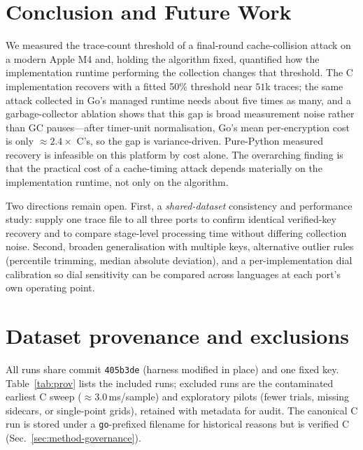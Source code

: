 \documentclass[11pt]{article}
\begin{document}
\section{Conclusion and Future Work}
\label{sec:conclusion}

We measured the trace-count threshold of a final-round cache-collision attack on
a modern Apple M4 and, holding the algorithm fixed, quantified how the
implementation runtime performing the collection changes that threshold. The C
implementation recovers with a fitted 50\% threshold near $51$k traces; the same
attack collected in Go's managed runtime needs about five times as many, and a
garbage-collector ablation shows that this gap is broad measurement noise rather
than GC pauses---after timer-unit normalisation, Go's mean per-encryption cost is
only $\approx2.4\times$ C's, so the gap is variance-driven. Pure-Python measured
recovery is infeasible on this platform by cost alone. The overarching finding is
that the practical cost of a cache-timing attack depends materially on the
implementation runtime, not only on the algorithm.

Two directions remain open. First, a \emph{shared-dataset} consistency and
performance study: supply one trace file to all three ports to confirm identical
verified-key recovery and to compare stage-level processing time without
differing collection noise. Second, broaden generalisation with multiple keys,
alternative outlier rules (percentile trimming, median absolute deviation), and a
per-implementation dial calibration so dial sensitivity can be compared across
languages at each port's own operating point.

\appendix
\section{Dataset provenance and exclusions}
\label{app:prov}
All runs share commit \texttt{405b3de} (harness modified in place) and one fixed
key. Table~\ref{tab:prov} lists the included runs; excluded runs are the
contaminated earliest C sweep ($\approx3.0$\,ms/sample) and exploratory
pilots (fewer trials, missing sidecars, or single-point grids), retained with
metadata for audit. The canonical C run is stored under a
\texttt{go}-prefixed filename for historical reasons but is verified C
(Sec.~\ref{sec:method-governance}).
\end{document}
